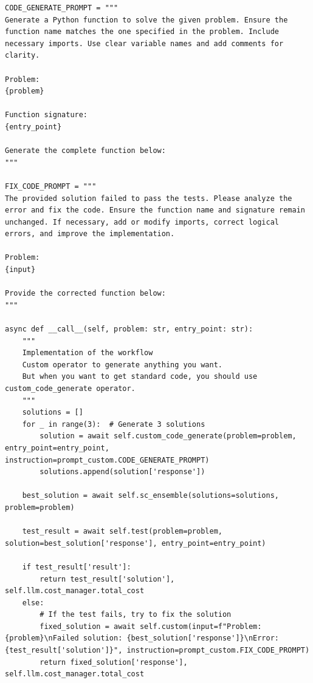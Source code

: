 \documentclass{article} %
\theoremstyle{plain}
\theoremstyle{definition}
\theoremstyle{remark}
\begin{document}
\begin{tcolorbox}[title={\textbf{\small The optimal workflow generated for MBPP}}, boxrule=1pt, arc=0mm, colback=black!5!white, colframe=black!75!white, breakable, before skip=10pt, after skip=10pt, pad at break=2mm, parbox=false] \begin{verbatim}
CODE_GENERATE_PROMPT = """
Generate a Python function to solve the given problem. Ensure the function name matches the one specified in the problem. Include necessary imports. Use clear variable names and add comments for clarity.

Problem:
{problem}

Function signature:
{entry_point}

Generate the complete function below:
"""

FIX_CODE_PROMPT = """
The provided solution failed to pass the tests. Please analyze the error and fix the code. Ensure the function name and signature remain unchanged. If necessary, add or modify imports, correct logical errors, and improve the implementation.

Problem:
{input}

Provide the corrected function below:
"""

async def __call__(self, problem: str, entry_point: str):
    """
    Implementation of the workflow
    Custom operator to generate anything you want.
    But when you want to get standard code, you should use custom_code_generate operator.
    """
    solutions = []
    for _ in range(3):  # Generate 3 solutions
        solution = await self.custom_code_generate(problem=problem, entry_point=entry_point, instruction=prompt_custom.CODE_GENERATE_PROMPT)
        solutions.append(solution['response'])
    
    best_solution = await self.sc_ensemble(solutions=solutions, problem=problem)
    
    test_result = await self.test(problem=problem, solution=best_solution['response'], entry_point=entry_point)
    
    if test_result['result']:
        return test_result['solution'], self.llm.cost_manager.total_cost
    else:
        # If the test fails, try to fix the solution
        fixed_solution = await self.custom(input=f"Problem: {problem}\nFailed solution: {best_solution['response']}\nError: {test_result['solution']}", instruction=prompt_custom.FIX_CODE_PROMPT)
        return fixed_solution['response'], self.llm.cost_manager.total_cost
\end{verbatim}
\end{tcolorbox}
\end{document}
